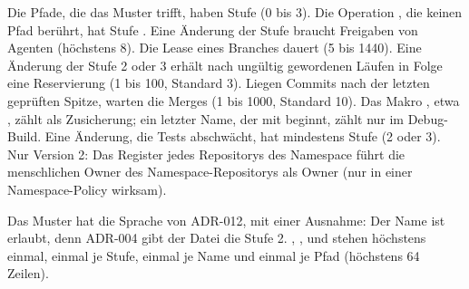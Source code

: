 \startplacetable[title={Die Zeilen einer Policy-Datei},reference=tab:policy-lines]
\startxtable[frame=off,option=stretch]
\startxrow[topframe=on,bottomframe=on]
 \stopxcell
{} \stopxcell
\stopxrow
\startxrow
\startxcell {} \stopxcell
\startxcell Die Pfade, die das Muster trifft, haben Stufe  (0 bis 3). \stopxcell
\stopxrow
\startxrow
\startxcell {} \stopxcell
\startxcell Die Operation , die keinen Pfad berührt, hat Stufe . \stopxcell
\stopxrow
\startxrow
\startxcell {} \stopxcell
\startxcell Eine Änderung der Stufe  braucht  Freigaben von Agenten
(höchstens 8). \stopxcell
\stopxrow
\startxrow
\startxcell {} \stopxcell
\startxcell Die Lease eines Branches dauert  (5 bis 1440). \stopxcell
\stopxrow
\startxrow
\startxcell {} \stopxcell
\startxcell Eine Änderung der Stufe 2 oder 3 erhält nach  ungültig gewordenen Läufen in
Folge eine Reservierung (1 bis 100, Standard 3). \stopxcell
\stopxrow
\startxrow
\startxcell {} \stopxcell
\startxcell Liegen  Commits nach der letzten geprüften Spitze, warten die Merges
(1 bis 1000, Standard 10). \stopxcell
\stopxrow
\startxrow
\startxcell {} \stopxcell
\startxcell Das Makro , etwa , zählt als
Zusicherung; ein letzter Name, der mit  beginnt, zählt nur im Debug-Build.
\stopxcell
\stopxrow
\startxrow
\startxcell {} \stopxcell
\startxcell Eine Änderung, die Tests abschwächt, hat mindestens Stufe  (2 oder 3).
\stopxcell
\stopxrow
\startxrow[bottomframe=on]
\startxcell {} \stopxcell
\startxcell Nur Version 2: Das Register jedes Repositorys des Namespace führt die menschlichen
Owner des Namespace-Repositorys als Owner (nur in einer Namespace-Policy wirksam). \stopxcell
\stopxrow
\stopxtable
\stopplacetable

Das Muster hat die Sprache von ADR-012, mit einer Ausnahme:
Der Name  ist erlaubt, denn ADR-004 gibt der Datei die Stufe 2.
, ,  und  stehen
höchstens einmal,  einmal je Stufe,
 einmal je Name und  einmal je Pfad (höchstens 64 Zeilen).

